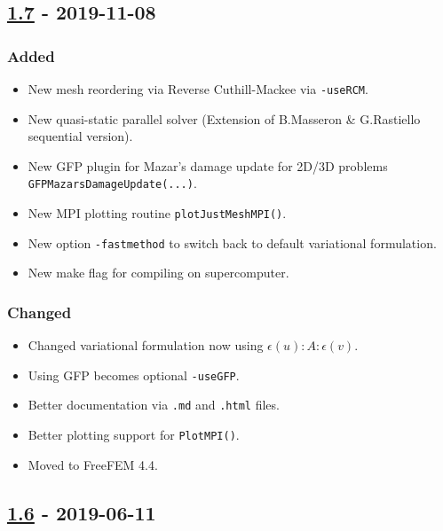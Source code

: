 \subsection{\texorpdfstring{\href{https://gitlab.com/PsdSolver/psd_sources/-/tree/v1.7}{1.7}
- 2019-11-08}{1.7 - 2019-11-08}}

\subsubsection{Added}

\begin{itemize}
\tightlist
\item
  New mesh reordering via Reverse Cuthill-Mackee via
  \lstinline!-useRCM!.
\item
  New quasi-static parallel solver (Extension of B.Masseron \&
  G.Rastiello sequential version).
\item
  New GFP plugin for Mazar's damage update for 2D/3D problems
  \lstinline!GFPMazarsDamageUpdate(...)!.
\item
  New MPI plotting routine \lstinline!plotJustMeshMPI()!.
\item
  New option \lstinline!-fastmethod! to switch back to default
  variational formulation.
\item
  New make flag for compiling on supercomputer.
\end{itemize}

\subsubsection{Changed}

\begin{itemize}
\tightlist
\item
  Changed variational formulation now using
  \(\epsilon(u):A:\epsilon(v)\).
\item
  Using GFP becomes optional \lstinline!-useGFP!.
\item
  Better documentation via \lstinline!.md! and \lstinline!.html! files.
\item
  Better plotting support for \lstinline!PlotMPI()!.
\item
  Moved to FreeFEM 4.4.
\end{itemize}

\subsection{\texorpdfstring{\href{https://gitlab.com/PsdSolver/psd_sources/-/tree/v1.6}{1.6}
- 2019-06-11}{1.6 - 2019-06-11}}

